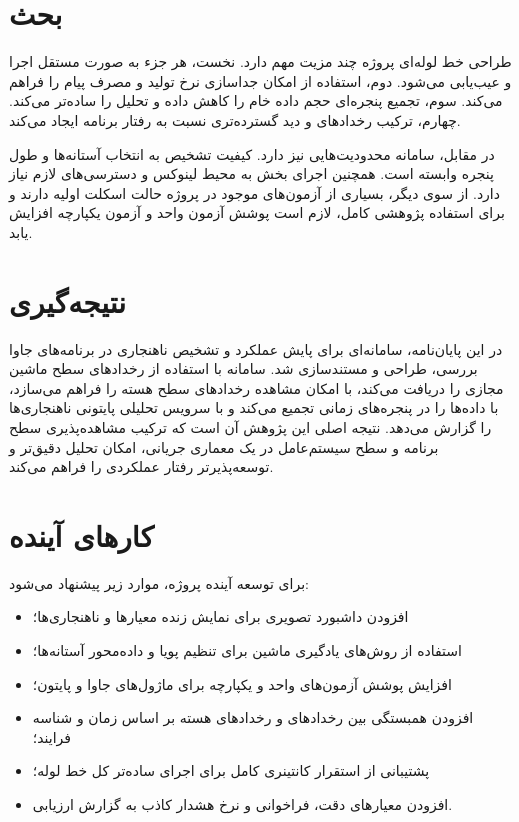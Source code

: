 \section{بحث}
طراحی خط لوله‌ای پروژه چند مزیت مهم دارد. نخست، هر جزء به صورت مستقل اجرا و عیب‌یابی می‌شود. دوم، استفاده از  امکان جداسازی نرخ تولید و مصرف پیام را فراهم می‌کند. سوم، تجمیع پنجره‌ای حجم داده خام را کاهش داده و تحلیل را ساده‌تر می‌کند. چهارم، ترکیب رخدادهای  و  دید گسترده‌تری نسبت به رفتار برنامه ایجاد می‌کند.

در مقابل، سامانه محدودیت‌هایی نیز دارد. کیفیت تشخیص به انتخاب آستانه‌ها و طول پنجره وابسته است. همچنین اجرای بخش  به محیط لینوکس و دسترسی‌های لازم نیاز دارد. از سوی دیگر، بسیاری از آزمون‌های موجود در پروژه حالت اسکلت اولیه دارند و برای استفاده پژوهشی کامل، لازم است پوشش آزمون واحد و آزمون یکپارچه افزایش یابد.

\section{نتیجه‌گیری}
در این پایان‌نامه، سامانه‌ای برای پایش عملکرد و تشخیص ناهنجاری در برنامه‌های جاوا بررسی، طراحی و مستندسازی شد. سامانه با استفاده از  رخدادهای سطح ماشین مجازی را دریافت می‌کند، با  امکان مشاهده رخدادهای سطح هسته را فراهم می‌سازد، با  داده‌ها را در پنجره‌های زمانی تجمیع می‌کند و با سرویس تحلیلی پایتونی ناهنجاری‌ها را گزارش می‌دهد. نتیجه اصلی این پژوهش آن است که ترکیب مشاهده‌پذیری سطح برنامه و سطح سیستم‌عامل در یک معماری جریانی، امکان تحلیل دقیق‌تر و توسعه‌پذیرتر رفتار عملکردی را فراهم می‌کند.

\section{کارهای آینده}
برای توسعه آینده پروژه، موارد زیر پیشنهاد می‌شود:
\begin{itemize}
\item افزودن داشبورد تصویری برای نمایش زنده معیارها و ناهنجاری‌ها؛
\item استفاده از روش‌های یادگیری ماشین برای تنظیم پویا و داده‌محور آستانه‌ها؛
\item افزایش پوشش آزمون‌های واحد و یکپارچه برای ماژول‌های جاوا و پایتون؛
\item افزودن همبستگی بین رخدادهای  و رخدادهای هسته بر اساس زمان و شناسه فرایند؛
\item پشتیبانی از استقرار کانتینری کامل برای اجرای ساده‌تر کل خط لوله؛
\item افزودن معیارهای دقت، فراخوانی و نرخ هشدار کاذب به گزارش ارزیابی.
\end{itemize}
